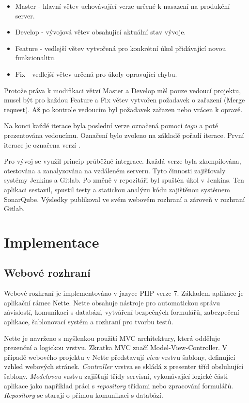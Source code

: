 \documentclass[thesis=B,czech]{FITthesis}[2012/06/26]
\begin{document}
\begin{itemize}
\item Master - hlavní větev uchovávající verze určené k nasazení na produkční server.
\item Develop - vývojová větev obsahující aktuální stav vývoje.
\item Feature - vedlejší větev vytvořená pro konkrétní úkol přidávající novou funkcionalitu.
\item Fix - vedlejší větev určená pro úkoly opravující chybu.
\end{itemize}

Protože práva k modifikaci větví Master a Develop měl pouze vedoucí projektu, musel být pro každou Feature a Fix větev
vytvořen požadavek o zařazení (Merge request). Až po kontrole vedoucím byl požadavek zařazen nebo vrácen k opravě.
\par
Na konci každé iterace byla poslední verze označená pomocí \textit{tagu} a poté prezentována vedoucímu.
Označení bylo zvoleno na základě pořadí iterace. První iterace je označena verzí .
\par
Pro vývoj se využil princip průběžné integrace. Každá verze byla zkompilována, otestována a zanalyzována na vzdáleném serveru.
Tyto činnosti zajišťovaly systémy Jenkins\cite{jenkins} a Gitlab. Po změně v repozitáři byl spuštěn úkol v Jenkins. Ten aplikaci sestavil, spustil testy a statickou analýzu kódu 
zajištěnou systémem SonarQube\cite{sonar}. Výsledky publikoval ve svém webovém rozhraní a zároveň v rozhraní Gitlab.  
\section{Implementace}


\subsection{Webové rozhraní}
Webové rozhraní je implementováno v jazyce PHP verze 7. Základem aplikace je aplikační rámec Nette\cite{nette}. Nette
obsahuje nástroje pro automatickou správu závislostí, komunikaci s databází, vytváření bezpečných formulářů, zabezpečení
aplikace, šablonovací systém a rozhraní pro tvorbu testů. 
\par
Nette je navrženo s myšlenkou použití MVC architektury, která odděluje
prezenční a logickou vrstvu. Zkratka MVC značí Model-View-Controller. V případě webového projektu v Nette představují \textit{view} vrstvu šablony, definující vzhled webových stránek. \textit{Controller} vrstva se skládá z presenter tříd obsluhující šablony. \textit{Modelovou} vrstvu  zajišťují třídy servisní, vykonávající logické části aplikace jako 
například práci s \textit{repository} třídami nebo zpracování formulářů. \textit{Repository} se starají o přímou komunikaci s databází.
\end{document}
